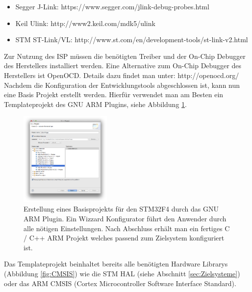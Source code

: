 \begin{itemize}
	\item Segger J-Link:
	\newline
	https://www.segger.com/jlink-debug-probes.html
	\item Keil Ulink: 
	\newline
	http://www2.keil.com/mdk5/ulink
	\item STM ST-Link/VL: 
	\newline
	http://www.st.com/en/development-tools/st-link-v2.html
\end{itemize}
Zur Nutzung des ISP müssen die benötigten Treiber und der On-Chip Debugger des Herstellers installiert werden. Eine Alternative zum On-Chip Debugger des Herstellers ist OpenOCD. Details dazu findet man unter:
\newline
\newline
http://openocd.org/
\newline
\newline            
Nachdem die Konfiguration der Entwicklungstools abgeschlossen ist, kann nun eine Basis Projekt erstellt werden. Hierfür verwendet man am Besten ein Templateprojekt des GNU ARM Plugins, siehe Abbildung \ref{fig:NewProj}.
\begin{figure}[htb]
	\centering
		\includegraphics[width=0.4\textwidth]{Pictures/Einrichtung/NewF4Project.png}
	\caption{Erstellung eines Basisprojekts für den STM32F4 durch das GNU ARM Plugin. Ein Wizzard Konfigurator führt den Anwender durch alle nötigen Einstellungen. Nach Abschluss erhält man ein fertiges C / C++ ARM Projekt welches passend zum Zielsystem konfiguriert ist.}
	\label{fig:NewProj}
\end{figure}
Das Templateprojekt beinhaltet bereits alle benötigten Hardware Librarys (Abbildung \ref{fig:CMSIS}) wie die STM HAL (siehe Abschnitt \ref{sec:Zielsysteme}) oder das ARM CMSIS (Cortex Microcontroller Software Interface Standard).
